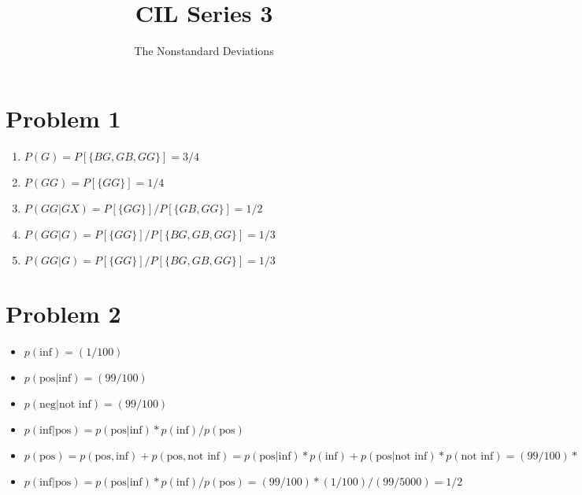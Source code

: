 \documentclass{scrartcl}
\title{CIL Series 3}
\author{The Nonstandard Deviations}
\begin{document}
  \maketitle

  \section*{Problem 1} %
  \label{sec:problem_1}
    \begin{enumerate}
      \item $P(G) = P[\{BG, GB, GG\}] = 3/4$
      \item $P(GG) = P[\{GG\}] = 1/4$
      \item $P(GG|GX) = P[\{GG\}] / P[\{GB, GG\}] = 1/2$
      \item $P(GG|G) = P[\{GG\}] / P[\{BG, GB, GG\}] = 1/3$
      \item $P(GG|G) = P[\{GG\}] / P[\{BG, GB, GG\}] = 1/3$
    \end{enumerate}

  \section*{Problem 2} %
  \label{sec:problem_2}
    \begin{itemize}
      \item $p(\text{inf}) = (1/100)$
      \item $p(\text{pos} | \text{inf}) = (99/100)$
      \item $p(\text{neg} | \text{not inf}) = (99/100)$
      \item $p(\text{inf} | \text{pos}) =
             p(\text{pos} | \text{inf}) * p(\text{inf}) / p(\text{pos})$
      \item $p(\text{pos}) = p(\text{pos}, \text{inf}) + p(\text{pos}, \text{not inf})
           = p(\text{pos} | \text{inf}) * p(\text{inf}) + p(\text{pos} | \text{not inf}) * p(\text{not inf})
           = (99/100) * (1/100) + (1/100) * (99/100) = (99/5000)$
      \item $p(\text{inf} | \text{pos}) =
             p(\text{pos} | \text{inf}) * p(\text{inf}) / p(\text{pos}) =
             (99/100) * (1/100) / (99/5000) = 1/2$
    \end{itemize}
\end{document}
